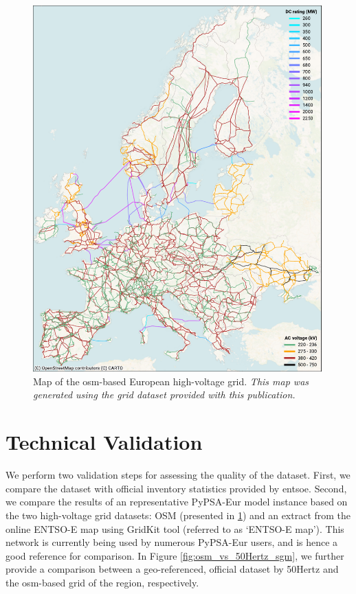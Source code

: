 \documentclass[fleqn,10pt]{wlscirep}
\let\autocite\cite
\begin{document}
\begin{figure}[!htbp]
    \centering
     \includegraphics[width=0.99\textwidth] {figures/fig_osm_map.pdf}
    \caption{Map of the \acrshort{osm}-based European high-voltage grid. \textit{This map was generated using the grid dataset provided with this publication. \autocite{xiongPrebuiltElectricityNetwork2024}}}
    \label{fig:osm_map}
\end{figure}


\newpage
\newpage
\section*{Technical Validation}
We perform two validation steps for assessing the quality of the dataset. First, we compare the dataset with official inventory statistics provided by \acrshort{entsoe}. Second, we compare the results of an representative PyPSA-Eur model instance based on the two high-voltage grid datasets: OSM (presented in \ref{fig:osm_map}) and an extract from the online ENTSO-E map using GridKit tool (referred to as ‘ENTSO-E map’).\autocite{wiegmansGridKitExtractENTSOE2016} This network is currently being used by numerous PyPSA-Eur users, and is hence a good reference for comparison. In Figure \ref{fig:osm_vs_50Hertz_sgm}, we further provide a comparison between a geo-referenced, official dataset by 50Hertz\autocite{50hertzStaticGridModel2022} and the \acrshort{osm}-based grid of the region, respectively.
\end{document}
